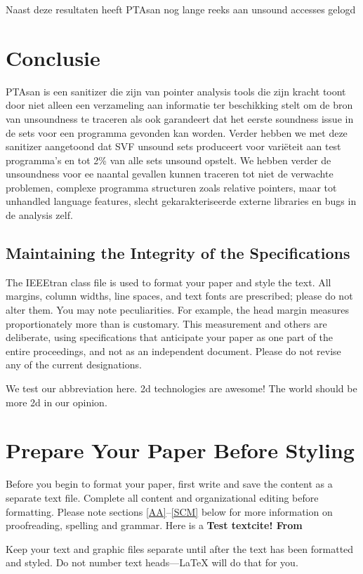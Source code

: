 \documentclass[conference]{IEEEtran}
\begin{document}
Naast deze resultaten heeft PTAsan nog lange reeks aan unsound accesses gelogd 

\section{Conclusie}

PTAsan is een sanitizer die zijn van pointer analysis tools die zijn kracht toont door niet alleen een verzameling aan informatie ter beschikking stelt om de bron van unsoundness te traceren als ook garandeert dat het eerste soundness issue in de sets voor een programma gevonden kan worden. Verder hebben we met deze sanitizer aangetoond dat SVF unsound sets produceert voor variëteit aan test programma's en tot 2\% van alle sets unsound opstelt. We hebben verder de unsoundness voor ee naantal gevallen kunnen traceren tot niet de verwachte problemen, complexe programma structuren zoals relative pointers, maar tot unhandled language features, slecht gekarakteriseerde externe libraries en bugs in de analysis zelf.  

\subsection{Maintaining the Integrity of the Specifications}

The IEEEtran class file is used to format your paper and style the text. All margins,
column widths, line spaces, and text fonts are prescribed; please do not
alter them. You may note peculiarities. For example, the head margin
measures proportionately more than is customary. This measurement
and others are deliberate, using specifications that anticipate your paper
as one part of the entire proceedings, and not as an independent document.
Please do not revise any of the current designations.

We test our abbreviation here. \gls{2d} technologies are awesome! The world should be more \gls{2d} in our opinion.
\section{Prepare Your Paper Before Styling}
Before you begin to format your paper, first write and save the content as a
separate text file. Complete all content and organizational editing before
formatting. Please note sections \ref{AA}--\ref{SCM} below for more information on
proofreading, spelling and grammar. Here is a \bf{Test textcite}! From \textcite{b1}

Keep your text and graphic files separate until after the text has been
formatted and styled. Do not number text heads---{\LaTeX} will do that
for you.
\end{document}
